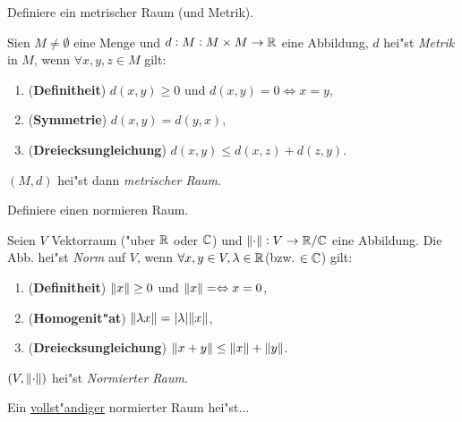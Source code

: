 \documentclass[9pt]{article}
\newcommand{\R}[1]{%
	\ifthenelse{\equal{#1}{}}
	{\mathbb{R}}
	{\mathbb{R}^{#1}}}%
\newcommand{\C}[1]{%
	\ifthenelse{\equal{#1}{}}
	{\mathbb{C}}
	{\mathbb{C}^{#1}}}%
\newenvironment{field}{}{\newpage}
\newif\ifnote
\newenvironment{note}{\notetrue}{\notefalse}
\newcommand{\localtag}{}
\newcommand{\globaltag}{}
\newcommand{\uuid}{}
\newcommand{\tags}[1]{
    \ifnote 
        \renewcommand{\localtag}{#1}
    \else
        \renewcommand{\globaltag}{#1}
    \fi 
    }
\newcommand{\xplain}[1]{\renewcommand{\uuid}{#1}}
\begin{document}

\tags{mathe2::2sem::hilbertraum}

\begin{note}
	\xplain{efb36bac-25bb-4609-b9f4-58c90b79383b}
	\tags{satzt, metrischer-raum}
	
	\begin{field}  %
		Definiere ein metrischer Raum (und Metrik).
	\end{field}
	
	\begin{field}  %
		Sien $M \neq \emptyset$ eine Menge und $d: M: M \times M \rightarrow \R{}$ eine Abbildung,
		$d$ hei"st \textit{Metrik} in $M$, wenn $\forall x,y,z \in M$ gilt:
		\begin{enumerate}
			\item (\textbf{Definitheit}) $d(x,y) \geq 0$ und $d(x,y) = 0 \Leftrightarrow x=y $,
			\item (\textbf{Symmetrie}) $d(x,y) = d(y,x)$,
			\item (\textbf{Dreiecksungleichung}) $d(x,y) \leq d(x,z) + d(z,y)$.
		\end{enumerate}
	$(M,d)$ hei"st dann \textit{metrischer Raum}.
	\end{field}
		
	\begin{field}  %
		Definiere einen normieren Raum.
	\end{field}
	
	\begin{field}  %
		Seien $V$ Vektorraum ("uber $\R{}$ oder $\C{}$) und $\norm{\cdot} : V \rightarrow \R{}/\C{}$ eine Abbildung. Die Abb. hei"st \textit{Norm} auf $V$, wenn $\forall x,y \in V, \lambda \in \R{} $(bzw. $\in \C{}$) gilt:
		\begin{enumerate}
			\item (\textbf{Definitheit}) $\norm{x} \geq 0$ und $\norm{x} = \Leftrightarrow x =0$,
			\item (\textbf{Homogenit"at}) $\norm{\lambda x} = \abs{\lambda} \norm{x}$,
			\item (\textbf{Dreiecksungleichung}) $\norm{x+y} \leq \norm{x} + \norm{y}$.
		\end{enumerate}
	$(V,\norm{\cdot})$ hei"st \textit{Normierter Raum}.
	\end{field}
		
	\begin{field}  %
		Ein \underline{vollst"andiger} normierter Raum hei"st...
	\end{field}
	

\end{note}
\end{document}
